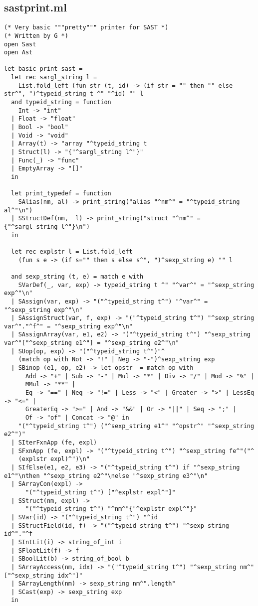 \documentclass[main.tex]{subfiles}
\begin{document}
\subsection{sastprint.ml}
\begin{lstlisting}
(* Very basic """pretty""" printer for SAST *)
(* Written by G *)
open Sast
open Ast

let basic_print sast = 
  let rec sargl_string l =
    List.fold_left (fun str (t, id) -> (if str = "" then "" else str^", ")^typeid_string t ^" "^id) "" l
  and typeid_string = function
    Int -> "int"
  | Float -> "float"
  | Bool -> "bool"
  | Void -> "void"
  | Array(t) -> "array "^typeid_string t
  | Struct(l) -> "{"^sargl_string l^"}"
  | Func(_) -> "func"
  | EmptyArray -> "[]"
  in

  let print_typedef = function
    SAlias(nm, al) -> print_string("alias "^nm^" = "^typeid_string al^"\n")
  | SStructDef(nm,  l) -> print_string("struct "^nm^" = {"^sargl_string l^"}\n")
  in

  let rec explstr l = List.fold_left
    (fun s e -> (if s="" then s else s^", ")^sexp_string e) "" l

  and sexp_string (t, e) = match e with
    SVarDef(_, var, exp) -> typeid_string t ^" "^var^" = "^sexp_string exp^"\n"
  | SAssign(var, exp) -> "("^typeid_string t^") "^var^" = "^sexp_string exp^"\n"
  | SAssignStruct(var, f, exp) -> "("^typeid_string t^") "^sexp_string var^"."^f^" = "^sexp_string exp^"\n"
  | SAssignArray(var, e1, e2) -> "("^typeid_string t^") "^sexp_string var^"["^sexp_string e1^"] = "^sexp_string e2^"\n"
  | SUop(op, exp) -> "("^typeid_string t^")"^
    (match op with Not -> "!" | Neg -> "-")^sexp_string exp
  | SBinop (e1, op, e2) -> let opstr  = match op with
      Add -> "+" | Sub -> "-" | Mul -> "*" | Div -> "/" | Mod -> "%" |
      MMul -> "**" |
      Eq -> "==" | Neq -> "!=" | Less -> "<" | Greater -> ">" | LessEq -> "<=" |
      GreaterEq -> ">=" | And -> "&&" | Or -> "||" | Seq -> ";" |
      Of -> "of" | Concat -> "@" in
    "("^typeid_string t^") ("^sexp_string e1^" "^opstr^" "^sexp_string e2^")"
  | SIterFxnApp (fe, expl)
  | SFxnApp (fe, expl) -> "("^typeid_string t^") "^sexp_string fe^"("^
    (explstr expl)^")\n"
  | SIfElse(e1, e2, e3) -> "("^typeid_string t^") if "^sexp_string e1^"\nthen "^sexp_string e2^"\nelse "^sexp_string e3^"\n"
  | SArrayCon(expl) -> 
      "("^typeid_string t^") ["^explstr expl^"]"
  | SStruct(nm, expl) -> 
      "("^typeid_string t^") "^nm^"{"^explstr expl^"}"
  | SVar(id) -> "("^typeid_string t^") "^id
  | SStructField(id, f) -> "("^typeid_string t^") "^sexp_string id^"."^f
  | SIntLit(i) -> string_of_int i
  | SFloatLit(f) -> f
  | SBoolLit(b) -> string_of_bool b
  | SArrayAccess(nm, idx) -> "("^typeid_string t^") "^sexp_string nm^"["^sexp_string idx^"]"
  | SArrayLength(nm) -> sexp_string nm^".length"
  | SCast(exp) -> sexp_string exp
  in


\end{lstlisting}
\end{document}
